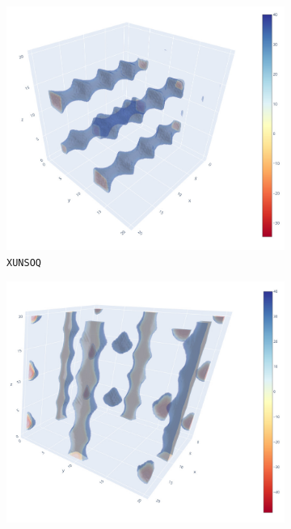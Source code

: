 \documentclass[main]{subfiles}
\begin{document}
\begin{figure}[ht]
  \centering
  \begin{subfigure}[b]{0.32\textwidth}
      \centering
      \includegraphics[width=\textwidth]{figures/5-diffusion/viz/XUNSOQ.jpg}
      \caption{\texttt{XUNSOQ}~\cite{Abrahams_2014}}\label{fgr:tube_cavities_a}
  \end{subfigure}
  \hfill
  \begin{subfigure}[b]{0.32\textwidth}
      \centering
      \includegraphics[width=\textwidth]{figures/5-diffusion/viz/BAEDTA01.jpg}

\end{subfigure}
\end{figure}
\end{document}
